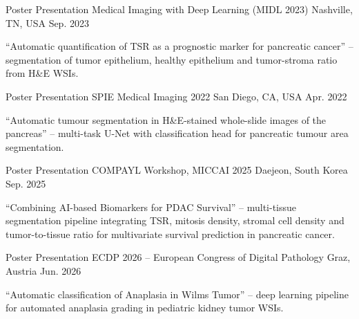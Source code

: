 

\begin{cventries}

  \cventry
    {Poster Presentation} %
    {Medical Imaging with Deep Learning (MIDL 2023)} %
    {Nashville, TN, USA} %
    {Sep. 2023} %
    {
      \begin{cvitems}
        \item {``Automatic quantification of TSR as a prognostic marker for pancreatic cancer'' -- segmentation of tumor epithelium, healthy epithelium and tumor-stroma ratio from H\&E WSIs.}
      \end{cvitems}
    }

  \cventry
    {Poster Presentation} %
    {SPIE Medical Imaging 2022} %
    {San Diego, CA, USA} %
    {Apr. 2022} %
    {
      \begin{cvitems}
        \item {``Automatic tumour segmentation in H\&E-stained whole-slide images of the pancreas'' -- multi-task U-Net with classification head for pancreatic tumour area segmentation.}
      \end{cvitems}
    }

  \cventry
    {Poster Presentation} %
    {COMPAYL Workshop, MICCAI 2025} %
    {Daejeon, South Korea} %
    {Sep. 2025} %
    {
      \begin{cvitems}
        \item {``Combining AI-based Biomarkers for PDAC Survival'' -- multi-tissue segmentation pipeline integrating TSR, mitosis density, stromal cell density and tumor-to-tissue ratio for multivariate survival prediction in pancreatic cancer.}
      \end{cvitems}
    }

  \cventry
    {Poster Presentation} %
    {ECDP 2026 -- European Congress of Digital Pathology} %
    {Graz, Austria} %
    {Jun. 2026} %
    {
      \begin{cvitems}
        \item {``Automatic classification of Anaplasia in Wilms Tumor'' -- deep learning pipeline for automated anaplasia grading in pediatric kidney tumor WSIs.}
      \end{cvitems}
    }

\end{cventries}
